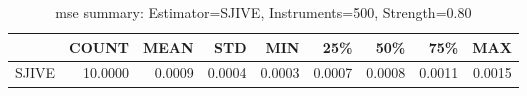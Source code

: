\begin{table}[ht]
\centering
\caption{mse summary: Estimator=SJIVE, Instruments=500, Strength=0.80}
\begin{tabular}{lrrrrrrrr}
\toprule
 & COUNT & MEAN & STD & MIN & 25\% & 50\% & 75\% & MAX \\
\midrule
SJIVE & 10.0000 & 0.0009 & 0.0004 & 0.0003 & 0.0007 & 0.0008 & 0.0011 & 0.0015 \\
\bottomrule
\end{tabular}
\end{table}
